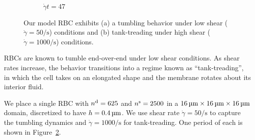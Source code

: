 \begin{figure}[thb]
\begin{subfigure}{\textwidth}
\begin{minipage}{0.2\textwidth}
        $\dot{\gamma}t = 47$
    \end{minipage}%
    \label{fig:tread}
    \end{subfigure}
    \caption{%
        Our model RBC exhibits (a) a tumbling behavior under low shear
        ($\dot{\gamma} = 50\si{\per\second}$) conditions and (b) tank-treading under high
        shear ($\dot{\gamma} = 1000\si{\per\second}$) conditions.
    }%
    \label{fig:tumble-tread}
\end{figure}

RBCs are known to tumble end-over-end under low shear conditions. As shear rates
increase, the behavior transitions into a regime known as ``tank-treading'', in which
the cell takes on an elongated shape and the membrane {\XXX} rotates about its interior
fluid.

We place a single RBC with ${n}^\text{d} = 625$ and ${n}^\text{s} = 2500$
in a $16\um\times16\um\times16\um$ domain, discretized to have $h = 0.4\um$. We use shear
rate $\dot{\gamma} = 50\si{\per\second}$ to capture the tumbling dynamics and
$\dot{\gamma} = 1000\si{\per\second}$ for tank-treading. One period of each is shown in
Figure~\ref{fig:tumble-tread}.
